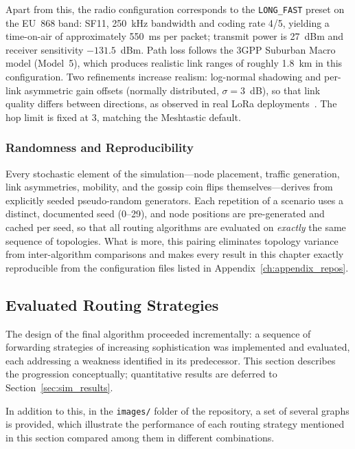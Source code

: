 \documentclass[english,bachelor]{tfgitic}[2026/01/22]
\begin{document}
Apart from this, the radio configuration corresponds to the \texttt{LONG\_FAST} preset on the EU~868 band: SF11, 250~kHz bandwidth and coding rate 4/5, yielding a time-on-air of approximately 550~ms per packet; transmit power is 27~dBm and receiver sensitivity $-131.5$~dBm. Path loss follows the 3GPP Suburban Macro model (Model~5), which produces realistic link ranges of roughly 1.8~km in this configuration. Two refinements increase realism: log-normal shadowing and per-link asymmetric gain offsets (normally distributed, $\sigma = 3$~dB), so that link quality differs between directions, as observed in real LoRa deployments~\cite{cattani2017reliability}. The hop limit is fixed at 3, matching the Meshtastic default.


\subsubsection{Randomness and Reproducibility}
 
Every stochastic element of the simulation---node placement, traffic generation, link asymmetries, mobility, and the gossip coin flips themselves---derives from explicitly seeded pseudo-random generators. Each repetition of a scenario uses a distinct, documented seed (0--29), and node positions are pre-generated and cached per seed, so that all routing algorithms are evaluated on \emph{exactly} the same sequence of topologies. What is more, this pairing eliminates topology variance from inter-algorithm comparisons and makes every result in this chapter exactly reproducible from the configuration files listed in Appendix~\ref{ch:appendix_repos}.

\subsection{Evaluated Routing Strategies}
\label{sec:sim_strategies}

The design of the final algorithm proceeded incrementally: a sequence of forwarding strategies of increasing sophistication was implemented and evaluated, each addressing a weakness identified in its predecessor. This section describes the progression conceptually; quantitative results are deferred to Section~\ref{sec:sim_results}.

In addition to this, in the \texttt{images/} folder of the repository, a set of several graphs is provided, which illustrate the performance of each routing strategy mentioned in this section compared among them in different combinations.
\end{document}
